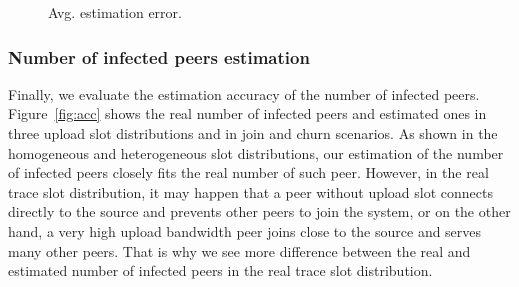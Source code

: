 {\begin{figure}[h]
\centering
{}
\caption{\small Avg. estimation error.}
\label{fig:distro}
\end{figure}

\subsubsection{Number of infected peers estimation}
Finally, we evaluate the estimation accuracy of the number of infected peers.
Figure~\ref{fig:acc} shows the real number of infected peers and estimated
ones in three upload slot distributions and in join and churn scenarios. As
shown in the homogeneous and heterogeneous slot distributions, our estimation
of the number of infected peers closely fits the real number of such peer.
However, in the real trace slot distribution, it may happen that a peer
without upload slot connects directly to the source and prevents other peers
to join the system, or on the other hand, a very high upload bandwidth peer
joins close to the source and serves many other peers. That is why we see more
difference between the real and estimated number of infected peers in the real
trace slot distribution.

}
